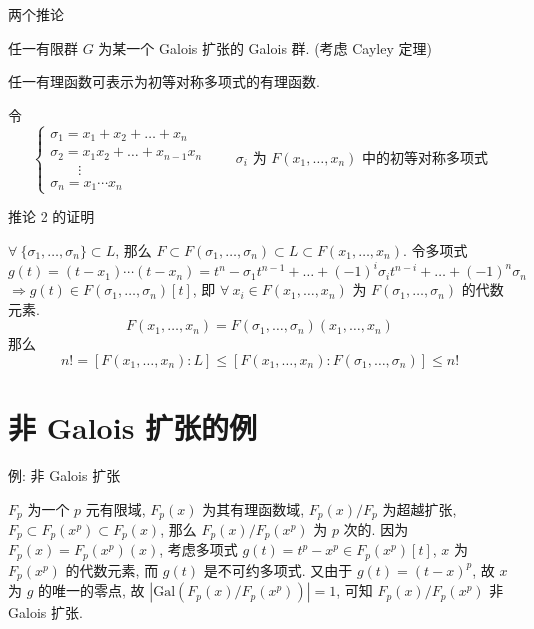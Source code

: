 
\begin{frame}{两个推论}

\begin{cor}
任一有限群 $G$ 为某一个 Galois 扩张的 Galois 群. (考虑 Cayley 定理)
\end{cor}

\begin{cor}
任一有理函数可表示为初等对称多项式的有理函数.
\end{cor}

\pause

令
\[
\begin{cases}
\sigma_1 = x_1 + x_2 + \dots + x_n \\
\sigma_2 = x_1 x_2 + \dots + x_{n-1} x_n \\
\qquad \vdots \\
\sigma_n = x_1 \dotsm x_n
\end{cases}
\qquad
\sigma_i \text{ 为 } F(x_1, \dots, x_n) \text{ 中的初等对称多项式}
\]

\end{frame}


\begin{frame}{推论 2 的证明}

$\forall\ \{ \sigma_1, \dots, \sigma_n \} \subset L$, 那么
$F \subset F(\sigma_1, \dots, \sigma_n) \subset L \subset F(x_1, \dots, x_n)$.
令多项式
\[
g(t) = (t - x_1) \dotsm (t - x_n)
= t^n - \sigma_1 t^{n-1} + \dots + (-1)^i \sigma_i t^{n-i} + \dots + (-1)^n \sigma_n
\]
$\Longrightarrow g(t) \in F(\sigma_1, \dots, \sigma_n)[t]$,
即 $\forall\ x_i \in F(x_1, \dots, x_n)$ 为 $F(\sigma_1, \dots, \sigma_n)$
的代数元素.
\[
F(x_1, \dots, x_n) = F(\sigma_1, \dots, \sigma_n)(x_1, \dots, x_n)
\]
那么
\[
n! = [F(x_1, \dots, x_n):L] \leq [F(x_1, \dots, x_n):F(\sigma_1, \dots, \sigma_n)] \leq n!
\]

\end{frame}


\section[反例]{非 Galois 扩张的例}


\begin{frame}{例: 非 Galois 扩张}

\begin{eg}
$F_p$ 为一个 $p$ 元有限域, $F_p(x)$ 为其有理函数域,
$F_p(x)/F_p$ 为超越扩张,
$F_p \subset F_p(x^p) \subset F_p(x)$, 那么 $F_p(x)/F_p(x^p)$ 为 $p$ 次的.
因为 $F_p(x) = F_p(x^p)(x)$,
考虑多项式 $g(t) = t^p - x^p \in F_p(x^p)[t]$,
$x$ 为 $F_p(x^p)$ 的代数元素, 而 $g(t)$ 是不可约多项式.
又由于 $g(t) = (t - x)^p$, 故 $x$ 为 $g$ 的唯一的零点,
故 $|\mathrm{Gal}(F_p(x)/F_p(x^p))| = 1$,
可知 $F_p(x)/F_p(x^p)$ 非 Galois 扩张.
\end{eg}

\end{frame}



